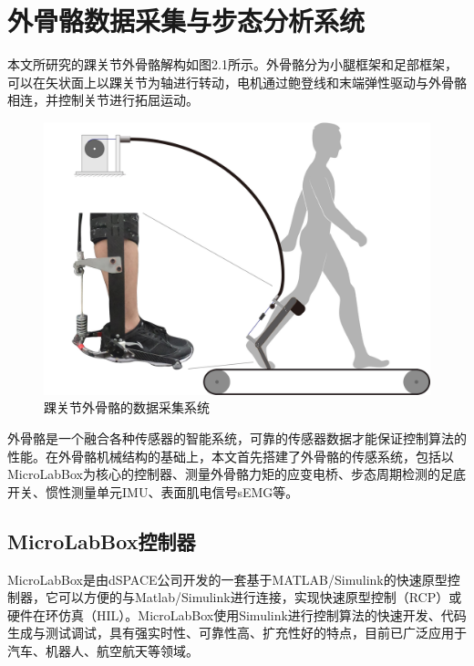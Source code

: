 \chapter{外骨骼数据采集与步态分析系统}

本文所研究的踝关节外骨骼解构如图2.1所示。外骨骼分为小腿框架和足部框架，可以在矢状面上以踝关节为轴进行转动，电机通过鲍登线和末端弹性驱动与外骨骼相连，并控制关节进行拓屈运动。
\begin{figure}[htb]
    \includegraphics[width=12cm]{fig/f19.jpg}
    \caption{踝关节外骨骼的数据采集系统}
    \label{fig:mark}
\end{figure}

外骨骼是一个融合各种传感器的智能系统，可靠的传感器数据才能保证控制算法的性能。在外骨骼机械结构的基础上，本文首先搭建了外骨骼的传感系统，包括以MicroLabBox为核心的控制器、测量外骨骼力矩的应变电桥、步态周期检测的足底开关、惯性测量单元IMU、表面肌电信号sEMG等。

\section{MicroLabBox控制器}

MicroLabBox是由dSPACE公司开发的一套基于MATLAB/Simulink的快速原型控制器，它可以方便的与Matlab/Simulink进行连接，实现快速原型控制（RCP）或硬件在环仿真（HIL）。MicroLabBox使用Simulink进行控制算法的快速开发、代码生成与测试调试，具有强实时性、可靠性高、扩充性好的特点，目前已广泛应用于汽车、机器人、航空航天等领域。

